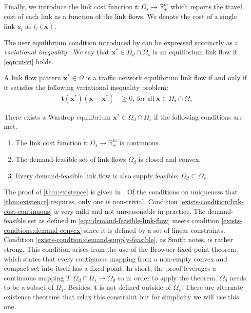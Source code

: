 Finally, we introduce the link cost function $\mathbf{t}: \Omega_s \to \mathbb{R}_+^m$ which reports the travel cost of each link as a function of the link flows.
We denote the cost of a single link $a_i$ as $t_i(\mathbf{x})$.

The user equilibrium condition introduced by \citet{wardrop1952some} can be expressed succinctly as a \textit{variational inequality} \citep{smith1979existence,dafermos1980traffic,nagurney2009netecon}.
We say that $\mathbf{x^*}\in\Omega_d\cap \Omega_s$ is an equilibrium link flow if \eqref{eqn:ui-vi} holds.

\begin{theorem}
    \label{thm:ui-vi}
    A link flow pattern $\mathbf{x}^* \in \Omega$ is a traffic network equilibrium link flow if and only if it satisfies the following variational inequality problem:
    \begin{align}
        \mathbf{t}(\mathbf{x^*})(\mathbf{x}- \mathbf{x^*}) &\geq 0,\ \text{for all}\ \mathbf{x} \in \Omega_d\cap \Omega_s \label{eqn:ui-vi}
    \end{align}
\end{theorem}

\begin{theorem}[Existence]
\label{thm:existence}
    There exists a Wardrop equilibrium $\mathbf{x}^* \in \Omega_d \cap \Omega_s$ if the following conditions are met.
    \begin{enumerate}
        \item The link cost function $\mathbf{t}: \Omega_s \to \mathbb{R}_+^m$ is continuous.\label{exists-condition:link-cost-continuous}
        \item The demand-feasible set of link flows $\Omega_d$ is closed and convex.\label{exists-condtions:demand-convex}
        \item Every demand-feasible link flow is also supply feasible: $\Omega_d \subseteq \Omega_s$. \label{exists-condtion:demand-supply-feasible}
    \end{enumerate}
\end{theorem}

The proof of \cref{thm:existence} is given in \citet{smith1979existence}.
Of the conditions on uniqueness that \cref{thm:existence} requires, only one is non-trivial.
Condition \ref{exists-condition:link-cost-continuous} is very mild and not unreasonable in practice.
The demand-feasible set as defined in \eqref{eqn:demand-feasible-link-flow} meets condition \ref{exists-condtions:demand-convex} since it is defined by a set of linear constraints.
Condition \ref{exists-condtion:demand-supply-feasible}, as Smith notes, is rather strong.
This condition arises from the use of the Browuer fixed-point theorem, which states that every continuous mapping from a non-empty convex and compact set into itself has a fixed point.
In short, the proof leverages a continuous mapping  $T: \Omega_d\cap \Omega_s \to \Omega_d$ so in order to apply the theorem, $\Omega_d$ needs to be a subset of $\Omega_s$.
Besides, $\mathbf{t}$ is not defined outside of $\Omega_s$.
There are alternate existence theorems that relax this constraint but for simplicity we will use this one.

